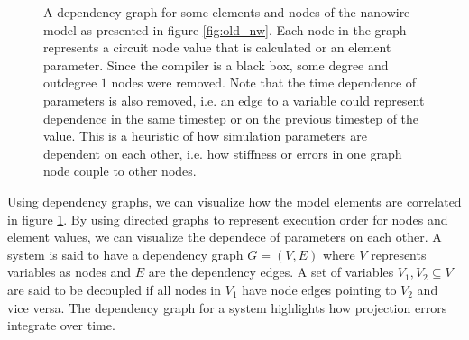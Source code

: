 \begin{figure}
    \centering
    \caption{A dependency graph for some elements and nodes of the nanowire model as presented in
    figure \ref{fig:old_nw}. Each node in the graph represents
    a circuit node value that is calculated or an element parameter.
    Since the compiler is a black box,
    some degree and outdegree $1$ nodes were removed. Note that the time dependence
    of parameters is also removed, i.e. an edge to a variable could represent
    dependence in the same timestep or on the previous timestep of the value.
    This is a heuristic of how simulation parameters
    are dependent on each other, i.e. how stiffness or errors in one graph node couple to other nodes.}
    \label{fig:dependency_graph}
\end{figure}

Using dependency graphs, we can visualize how the model elements
are correlated in figure \ref{fig:dependency_graph}. 
By using directed graphs to represent execution 
order for nodes and element values, we can visualize the dependece
of parameters on each other. A system is said to have a dependency graph $G = (V, E)$
where $V$ represents variables as nodes and $E$ are the dependency edges.
A set of variables $V_1, V_2 \subseteq V$ are said to be decoupled if all nodes
in $V_1$ have node edges pointing to $V_2$ and vice versa. The dependency
graph for a system highlights how projection errors integrate over time.


